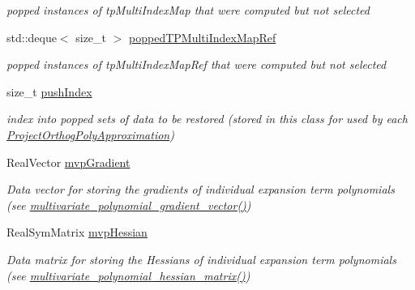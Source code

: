 \begin{DoxyCompactItemize}
\begin{DoxyCompactList}\small\item\em popped instances of tp\+Multi\+Index\+Map that were computed but not selected \end{DoxyCompactList}\item 
std\+::deque$<$ size\+\_\+t $>$ \hyperlink{classPecos_1_1SharedOrthogPolyApproxData_a177be9ac834e3c3103e5d1eab51bd173}{popped\+T\+P\+Multi\+Index\+Map\+Ref}\label{classPecos_1_1SharedOrthogPolyApproxData_a177be9ac834e3c3103e5d1eab51bd173}

\begin{DoxyCompactList}\small\item\em popped instances of tp\+Multi\+Index\+Map\+Ref that were computed but not selected \end{DoxyCompactList}\item 
size\+\_\+t \hyperlink{classPecos_1_1SharedOrthogPolyApproxData_aed737882b65bc8536b4aa19e071cef74}{push\+Index}\label{classPecos_1_1SharedOrthogPolyApproxData_aed737882b65bc8536b4aa19e071cef74}

\begin{DoxyCompactList}\small\item\em index into popped sets of data to be restored (stored in this class for used by each \hyperlink{classPecos_1_1ProjectOrthogPolyApproximation}{Project\+Orthog\+Poly\+Approximation}) \end{DoxyCompactList}\item 
Real\+Vector \hyperlink{classPecos_1_1SharedOrthogPolyApproxData_aa80b829d479c23093079c205a4be1308}{mvp\+Gradient}\label{classPecos_1_1SharedOrthogPolyApproxData_aa80b829d479c23093079c205a4be1308}

\begin{DoxyCompactList}\small\item\em Data vector for storing the gradients of individual expansion term polynomials (see \hyperlink{classPecos_1_1SharedOrthogPolyApproxData_a3f1d99f04ecf6f8d8bec6163bc83b657}{multivariate\+\_\+polynomial\+\_\+gradient\+\_\+vector()}) \end{DoxyCompactList}\item 
Real\+Sym\+Matrix \hyperlink{classPecos_1_1SharedOrthogPolyApproxData_ae6e4cbe9425f39cfe1dd453bfecdb27f}{mvp\+Hessian}\label{classPecos_1_1SharedOrthogPolyApproxData_ae6e4cbe9425f39cfe1dd453bfecdb27f}

\begin{DoxyCompactList}\small\item\em Data matrix for storing the Hessians of individual expansion term polynomials (see \hyperlink{classPecos_1_1SharedOrthogPolyApproxData_a5b9320bbcac875653a205a019c4cd18a}{multivariate\+\_\+polynomial\+\_\+hessian\+\_\+matrix()}) \end{DoxyCompactList}\end{DoxyCompactItemize}
